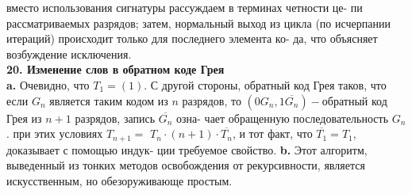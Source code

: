 вместо использования сигнатуры рассуждаем в терминах четности це-\linebreak
пи рассматриваемых разрядов; затем, нормальный выход из цикла (по\linebreak
исчерпании итераций) происходит только для последнего элемента ко-\linebreak
да, что объясняет возбуждение исключения.\\
\noindent\textbf{20. Изменение слов в обратном коде Грея}\\
\hspace*{15pt}\textbf{a.} Очевидно, что $T_1 = (1)$. С другой стороны, обратный код\linebreak
Грея таков, что если $G_n$ является таким кодом из $n$ разрядов, то\linebreak
$(0G_n,1\overline{G_n}) - $обратный код Грея из $n+1$ разрядов, запись $\overline{G_n}$ озна-\linebreak
чает обращенную последовательность $G_n$. при этих условиях $T_{n+1}=$\linebreak
$T_n\cdot(n+1)\cdot\overline{T_n}$, и тот факт, что $\overline{T_1}=T_1$, доказывает с помощью индук-\linebreak
ции требуемое свойство.\newline
\hspace*{15pt}\textbf{b.} Этот алгоритм, выведенный из тонких методов освобождения от\linebreak
рекурсивности, является искусственным, но обезоруживающе простым.
\newpage



